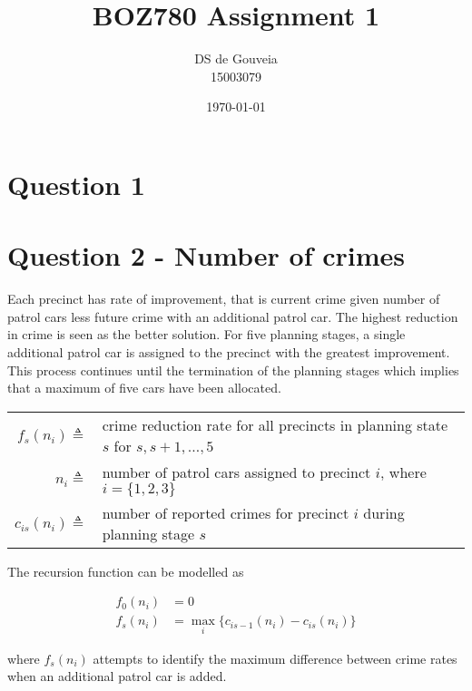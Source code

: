 \documentclass[a4paper,11pt]{article}
\title{BOZ780 Assignment 1}
\author{DS de Gouveia \\ 15003079}
\date{\today}
\begin{document}
\maketitle
\tableofcontents
\newpage

\section{Question 1}









\section{Question 2 - Number of crimes}

Each precinct has rate of improvement, that is current crime given number of patrol cars less future crime with an additional patrol car. The highest reduction in crime is seen as the better solution. For five planning stages, a single additional patrol car is assigned to the precinct with the greatest improvement. This process continues until the termination of the planning stages which implies that a maximum of five cars have been allocated.

\vspace{12pt}

\begin{tabular}{rl}
  $f_s(n_{i}) \triangleq$&  crime reduction rate for all precincts in planning state $s$ for $s,s+1,\dots, 5$\\
  $n_{i} \triangleq$ & number of patrol cars assigned to precinct $i$, where $i = \{1,2,3\}$  \\ 
  $c_{is}(n_i) \triangleq$ & number of reported crimes for precinct $i$ during planning stage $s$
\end{tabular}

\vspace{12pt}

The recursion function can be modelled as

\begin{align}
	f_0(n_i) &= 0 \\
	f_s(n_i) &= \max_i \{c_{is-1}(n_i) - c_{is}(n_i)\}
\end{align}

where $f_s(n_i)$ attempts to identify the maximum difference between crime rates when an additional patrol car is added.
\end{document}
